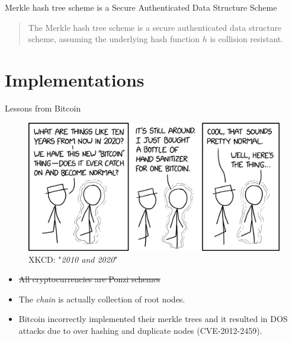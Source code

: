 \documentclass{beamer}
\begin{document}
\begin{frame}{Merkle hash tree scheme is a Secure Authenticated Data Structure Scheme}
	
	\begin{quote}The Merkle hash tree scheme is a secure authenticated data structure scheme,
		assuming the underlying hash function $h$ is collision resistant.  
	\end{quote}
	
\end{frame}



\section{Implementations}

\begin{frame}{Lessons from Bitcoin}
	\begin{multicols}{2}
		\begin{figure}
			\includegraphics[width=.45\textwidth]{../Images/xkcd-bitcoin.png}
			\caption{XKCD: "\textit{2010 and 2020}" \cite{xkcd-bitcoin}}
		\end{figure}
		
		\columnbreak
		
		\null \vfill
		\begin{itemize}
			\item \st{All cryptocurrencies are Ponzi schemes}
			\item The \textit{chain} is actually collection of root nodes.
			\item Bitcoin incorrectly implemented their merkle trees and it resulted in DOS attacks due to over hashing and duplicate nodes (CVE-2012-2459). 
		\end{itemize}
		\vfill \null
	\end{multicols}
\end{frame}
\end{document}
